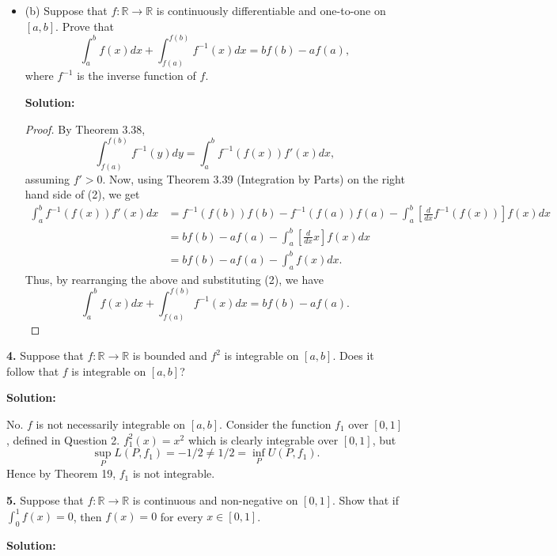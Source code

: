 \documentclass[12pt]{article}
\begin{document}
\begin{itemize}[label={},leftmargin=4mm, itemsep=1em, parsep=1em]
  \item (b) Suppose that $f:\mathbb{R} \rightarrow \mathbb{R}$ is continuously
    differentiable and one-to-one on $[a,b]$. Prove that 
    \[ \int_{a}^{b} f(x)dx + \int_{f(a)}^{f(b)}f^{-1}(x)dx = bf(b) - af(a),\]
    where $f^{-1}$ is the inverse function of $f$.

  {\bf Solution:}
  \begin{proof}
    By Theorem 3.38,
    \begin{equation}
      \int_{f(a)}^{f(b)}f^{-1}(y)dy = \int_{a}^{b}f^{-1}(f(x))f'(x)dx, 
    \end{equation}
    assuming $f' > 0$. Now, using Theorem 3.39 (Integration by Parts) on the right hand side of
    (2), we get
    \begin{align*}
      \int_{a}^{b}f^{-1}(f(x))f'(x)dx & = f^{-1}(f(b))f(b) - f^{-1}(f(a))f(a) -
      \int_{a}^{b}\left[\frac{d}{dx}f^{-1}(f(x))\right]f(x)dx \\
      & = bf(b) - af(a) - \int_{a}^{b}\left[\frac{d}{dx}x\right]f(x)dx \\
      & = bf(b) - af(a) - \int_{a}^{b}f(x)dx.
    \end{align*}
    Thus, by rearranging the above and substituting (2), we have 
    \[ \int_{a}^{b} f(x)dx + \int_{f(a)}^{f(b)}f^{-1}(x)dx = bf(b) - af(a). \]
  \end{proof}
\end{itemize}

{\bf 4.} Suppose that $f:\mathbb{R} \rightarrow \mathbb{R}$ is bounded and
$f^{2}$ is integrable on $[a,b]$. Does it follow that $f$ is integrable on
$[a,b]$?

{\bf Solution:}

No. $f$ is not necessarily integrable on $[a,b]$. Consider the function $f_{1}$
over $[0,1]$, defined in Question 2. $f^{2}_{1}(x) = x^{2}$ which is clearly
integrable over $[0,1]$, but 
\[ \sup_{P}L(P,f_{1}) = -1/2 \neq 1/2 = \inf_{P}U(P,f_{1}). \]
Hence by Theorem 19, $f_{1}$ is not integrable.

{\bf 5.} Suppose that $f:\mathbb{R}\rightarrow \mathbb{R}$ is continuous and
non-negative on $[0,1]$. Show that if $\int_{0}^{1}f(x) = 0$, then $f(x) = 0$
for every $x\in [0,1]$.

{\bf Solution:}
\end{document}
